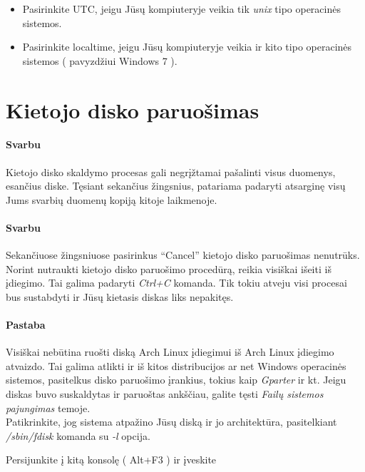 \begin{itemize}
  \item Pasirinkite UTC, jeigu Jūsų kompiuteryje veikia tik
    \textsl{unix} tipo operacinės sistemos.
  \item Pasirinkite localtime, jeigu Jūsų kompiuteryje veikia ir kito
    tipo operacinės sistemos ( pavyzdžiui Windows 7 ).
\end{itemize}

\section{Kietojo disko paruošimas}

\paragraph{Svarbu}

Kietojo disko skaldymo procesas gali negrįžtamai pašalinti visus
duomenys, esančius diske. Tęsiant sekančius žingsnius, patariama
padaryti atsarginę visų Jums svarbių duomenų kopiją kitoje laikmenoje. 

\paragraph{Svarbu}

Sekančiuose žingsniuose pasirinkus ``Cancel'' kietojo disko paruošimas
nenutrūks. Norint nutraukti kietojo disko paruošimo procedūrą, reikia
visiškai išeiti iš įdiegimo. Tai galima padaryti \textsl{Ctrl+C}
komanda. Tik tokiu atveju visi procesai bus sustabdyti ir Jūsų
kietasis diskas liks nepakitęs.

\paragraph{Pastaba}

Visiškai nebūtina ruošti diską Arch Linux įdiegimui iš Arch Linux
įdiegimo atvaizdo. Tai galima atlikti ir iš kitos distribucijos ar net
Windows operacinės sistemos, pasitelkus disko paruošimo įrankius,
tokius kaip \textsl{Gparter} ir kt. Jeigu diskas buvo suskaldytas ir
paruoštas ankščiau, galite tęsti \textsl{Failų sistemos pajungimas}
temoje.\\

Patikrinkite, jog sistema atpažino Jūsų diską ir jo architektūra,
pasitelkiant \textsl{/sbin/fdisk} komanda su \textsl{-l} opcija.

Persijunkite į kitą konsolę ( Alt+F3 ) ir įveskite

